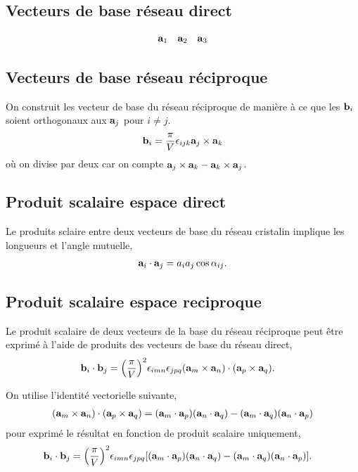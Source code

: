 \documentclass[11pt]{article}
\begin{document}
\subsection{Vecteurs de base réseau direct}

\begin{align*}
	\vb{a}_1 && \vb{a}_2 && \vb{a}_3
\end{align*} 

\subsection{Vecteurs de base réseau réciproque}

On construit les vecteur de base du réseau réciproque de manière à ce que les $\vb{b}_i$ soient orthogonaux aux $\vb{a}_j$ pour $i \neq j$. 
\begin{align*}
	\vb{b}_i = \frac{\pi}{V} \epsilon_{ijk} \vb{a}_j \times \vb{a}_k
\end{align*} où on divise par deux car on compte $\vb{a}_j \times \vb{a}_k - \vb{a}_k \times \vb{a}_j$. 

\subsection{Produit scalaire espace direct}
\label{ssec:dotRR}

Le produits sclaire entre deux vecteurs de base du réseau cristalin implique les longueurs et l'angle mutuelle,
\begin{align*}
	\vb{a}_i\cdot\vb{a}_j = a_i a_j \cos\alpha_{ij}.
\end{align*}

\subsection{Produit scalaire espace reciproque}
Le produit scalaire de deux vecteurs de la base du réseau réciproque peut être exprimé à l'aide de produits des vecteurs de base du réseau direct,
\begin{align*}
	\vb{b}_i \cdot \vb{b}_j 
	&= \pqty{\frac{\pi}{V}}^2 \epsilon_{imn} \epsilon_{jpq} \pqty{ \vb{a}_m \times \vb{a}_n}\cdot\pqty{ \vb{a}_p \times \vb{a}_q}.
\end{align*}

On utilise l'identité vectorielle suivante,
\begin{align*}
	\pqty{ \vb{a}_m \times \vb{a}_n}\cdot\pqty{ \vb{a}_p \times \vb{a}_q} = \pqty{\vb{a}_m\cdot\vb{a}_p}\pqty{\vb{a}_n\cdot\vb{a}_q} - \pqty{\vb{a}_m\cdot\vb{a}_q}\pqty{\vb{a}_n\cdot\vb{a}_p}
\end{align*} pour exprimé le résultat en fonction de produit scalaire uniquement,
\begin{align*}
	\vb{b}_i \cdot \vb{b}_j 
	&= \pqty{\frac{\pi}{V}}^2 \epsilon_{imn} \epsilon_{jpq} \bqty{\pqty{\vb{a}_m\cdot\vb{a}_p}\pqty{\vb{a}_n\cdot\vb{a}_q} - \pqty{\vb{a}_m\cdot\vb{a}_q}\pqty{\vb{a}_n\cdot\vb{a}_p}}.
\end{align*}
\end{document}
